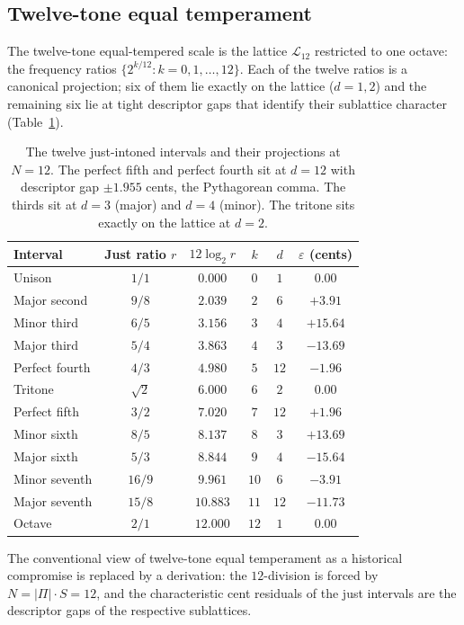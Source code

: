 \documentclass[11pt,a4paper]{article}
\theoremstyle{definition}
\theoremstyle{remark}
\newcommand{\eps}{\varepsilon}
\begin{document}
\subsection{Twelve-tone equal temperament}\label{subsec:temperament}

The twelve-tone equal-tempered scale is the lattice $\mathcal{L}_{12}$ restricted to one octave: the frequency ratios $\{2^{k/12} : k=0,1,\ldots,12\}$. Each of the twelve ratios is a canonical projection; six of them lie exactly on the lattice ($d=1,2$) and the remaining six lie at tight descriptor gaps that identify their sublattice character (Table~\ref{tab:intervals}).

\begin{table}[h]
\centering
\begin{tabular}{@{}l c c c c c@{}}
\toprule
Interval & Just ratio $r$ & $12\log_{2}r$ & $k$ & $d$ & $\eps$ (cents)\\
\midrule
Unison & $1/1$ & $0.000$ & $0$ & $1$ & $0.00$\\
Major second & $9/8$ & $2.039$ & $2$ & $6$ & $+3.91$\\
Minor third & $6/5$ & $3.156$ & $3$ & $4$ & $+15.64$\\
Major third & $5/4$ & $3.863$ & $4$ & $3$ & $-13.69$\\
Perfect fourth & $4/3$ & $4.980$ & $5$ & $12$ & $-1.96$\\
Tritone & $\sqrt{2}$ & $6.000$ & $6$ & $2$ & $0.00$\\
Perfect fifth & $3/2$ & $7.020$ & $7$ & $12$ & $+1.96$\\
Minor sixth & $8/5$ & $8.137$ & $8$ & $3$ & $+13.69$\\
Major sixth & $5/3$ & $8.844$ & $9$ & $4$ & $-15.64$\\
Minor seventh & $16/9$ & $9.961$ & $10$ & $6$ & $-3.91$\\
Major seventh & $15/8$ & $10.883$ & $11$ & $12$ & $-11.73$\\
Octave & $2/1$ & $12.000$ & $12$ & $1$ & $0.00$\\
\bottomrule
\end{tabular}
\caption{The twelve just-intoned intervals and their projections at $N=12$. The perfect fifth and perfect fourth sit at $d=12$ with descriptor gap $\pm 1.955$ cents, the Pythagorean comma. The thirds sit at $d=3$ (major) and $d=4$ (minor). The tritone sits exactly on the lattice at $d=2$.}
\label{tab:intervals}
\end{table}

The conventional view of twelve-tone equal temperament as a historical compromise is replaced by a derivation: the $12$-division is forced by $N=|\Pi|\cdot S=12$, and the characteristic cent residuals of the just intervals are the descriptor gaps of the respective sublattices.
\end{document}
